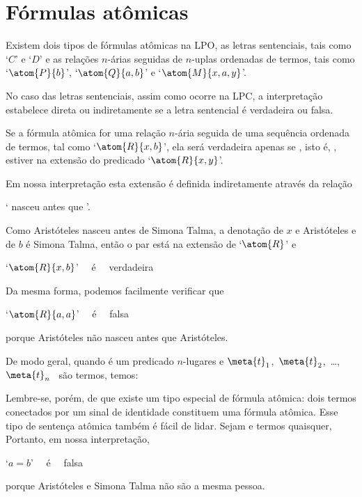 \section{Fórmulas atômicas}
Existem dois tipos de fórmulas atômicas na LPO, as letras sentenciais, tais como `$C$' e `$D$' e as relações $n$-árias seguidas de $n$-uplas ordenadas de termos, tais como `$\atom{P}{b}$', $`\atom{Q}{a,b}$' e `$\atom{M}{x,a,y}$'.

No caso das letras sentenciais, assim como ocorre na LPC, a interpretação estabelece direta ou indiretamente se a letra sentencial é verdadeira ou falsa.

Se a fórmula atômica for uma relação $n$-ária seguida de uma sequência ordenada de termos, tal como `$\atom{R}{x,b}$', ela será verdadeira apenas se , isto é,  , estiver na extensão do predicado `$\atom{R}{x,y}$'. 

Em nossa interpretação esta extensão é definida indiretamente através da relação
\begin{center}
	` nasceu antes que '.
\end{center}	
Como Aristóteles nasceu antes de Simona Talma, a denotação de $x$ e Aristóteles e de $b$ é Simona Talma, então o par  está na extensão de `$\atom{R}$' e
\begin{center}
	`$\atom{R}{x,b}$' \ \ é \ \ verdadeira
\end{center}
Da mesma forma, podemos facilmente verificar que 
\begin{center}
	`$\atom{R}{a,a}$' \ \ é \ \ falsa
\end{center}
porque Aristóteles não nasceu antes que Aristóteles.

De modo geral, quando  é um predicado $n$-lugares e \mbox{$\meta{t}_1 $, $\meta{t}_{2}$, \dots, $\meta{t}_{n}$} \ são termos, temos:

Lembre-se, porém, de que existe um tipo especial de fórmula atômica: dois termos conectados por um sinal de identidade constituem uma fórmula atômica.
Esse tipo de sentença atômica também é fácil de lidar.
Sejam  e  termos quaisquer,
Portanto, em nossa interpretação,
\begin{center}
	`$a=b$' \ \ é \ \ falsa
\end{center}
porque Aristóteles e Simona Talma não são a mesma pessoa.


